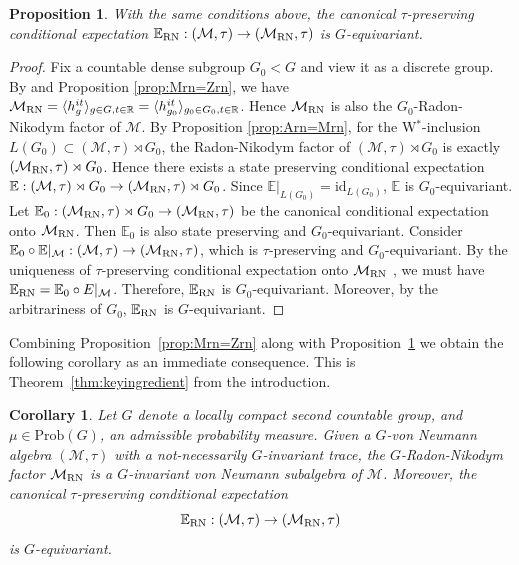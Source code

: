 \documentclass[12pt]{amsart}
\newcommand{\R}{{\mathbb R}}
\newcommand{\cM}{{\mathcal M}}
\newcommand{\RN}{{\rm RN}}
\def\Prob{\mathrm{Prob}}
\def\id {\mathrm{id}}
\newtheorem{cor}[thm]{Corollary}
\newtheorem{proposition}[thm]{Proposition}
\theoremstyle{definition}
\begin{document}
\begin{proposition}\label{prop:conditional expectation onto RN factor}
With the same conditions above, the canonical $\tau$-preserving conditional expectation $\mathbb{E}_\RN:(\cM,\tau)\to(\cM_\RN,\tau)$ is $G$-equivariant.
\end{proposition}
\begin{proof}
Fix a countable dense subgroup $G_0<G$ and view it as a discrete group. By \cite[Proposition 1.14]{NZ00} and Proposition \ref{prop:Mrn=Zrn}, we have $\cM_\RN=\langle h_g^{it}\rangle_{g\in G, t\in\R}=\langle h_{g_0}^{it}\rangle_{g_0\in G_0, t\in\R}$. Hence $\cM_\RN$ is also the $G_0$-Radon-Nikodym factor of $\cM$. By Proposition \ref{prop:Arn=Mrn}, for the W$^*$-inclusion $L(G_0)\subset(\cM,\tau)\rtimes G_0$, the Radon-Nikodym factor of $(\cM,\tau)\rtimes G_0$ is exactly $(\cM_\RN,\tau)\rtimes G_0$. Hence there exists a state preserving conditional expectation $\mathbb{E}:(\cM,\tau)\rtimes G_0\to(\cM_\RN,\tau)\rtimes G_0$. Since $\mathbb{E}|_{L(G_0)}=\id_{L(G_0)}$, $\mathbb{E}$ is $G_0$-equivariant. Let $\mathbb{E}_0:(\cM_\RN,\tau)\rtimes G_0\to(\cM_\RN,\tau)$ be the canonical conditional expectation onto $\cM_\RN$. Then $\mathbb{E}_0$ is also state preserving and $G_0$-equivariant. Consider $\mathbb{E}_0\circ \mathbb{E}|_\cM:(\cM,\tau)\to(\cM_\RN,\tau)$, which is $\tau$-preserving and $G_0$-equivariant. By the uniqueness of $\tau$-preserving conditional expectation onto $\cM_\RN$ \cite[Theorem IX.4.2]{TakesakiBookII}, we must have $\mathbb{E}_\RN=\mathbb{E}_0\circ E|_\cM$. Therefore, $\mathbb{E}_\RN$ is $G_0$-equivariant. Moreover, by the arbitrariness of $G_0$, $\mathbb{E}_\RN$ is $G$-equivariant.
\end{proof}
Combining Proposition~\ref{prop:Mrn=Zrn} along with Proposition~\ref{prop:conditional expectation onto RN factor} we obtain the following corollary as an immediate consequence. This is Theorem~\ref{thm:keyingredient} from the introduction. 
\begin{cor}
Let $G$ denote a locally compact second countable group,  and $\mu\in\Prob(G)$, an admissible probability measure. Given a $G$-von Neumann algebra $(\cM,\tau)$ with a not-necessarily $G$-invariant trace, the $G$-Radon-Nikodym factor $\cM_\RN$ is a $G$-invariant von Neumann subalgebra of $\cM$.  Moreover, the canonical $\tau$-preserving conditional expectation $$\mathbb{E}_\RN:(\cM,\tau)\to(\cM_\RN,\tau)$$ is $G$-equivariant.     
\end{cor}
\end{document}
